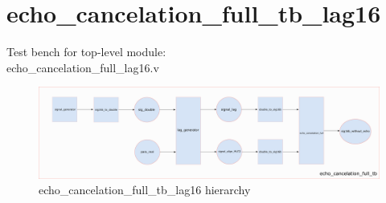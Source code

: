 \documentclass[twoside,a4paper]{refart}
\begin{document}
\section{echo\_cancelation\_full\_tb\_lag16}
Test bench for top-level module:\\
echo\_cancelation\_full\_lag16.v\\
\begin{figure}[H]
	\centering
	\includegraphics[scale=0.7]{echo_cancelation_full_tb.png}
	\caption{echo\_cancelation\_full\_tb\_lag16 hierarchy}
	\label{}
\end{figure}



\printindex
\end{document}

